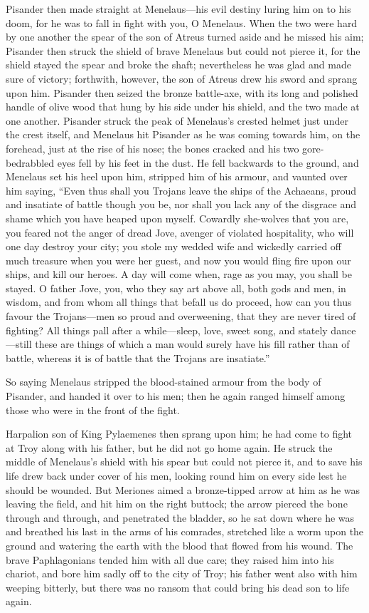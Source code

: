 Pisander then made straight at Menelaus—his evil destiny luring him
on to his doom, for he was to fall in fight with you, O Menelaus. When the
two were hard by one another the spear of the son of Atreus turned aside
and he missed his aim; Pisander then struck the shield of brave Menelaus
but could not pierce it, for the shield stayed the spear and broke the
shaft; nevertheless he was glad and made sure of victory; forthwith,
however, the son of Atreus drew his sword and sprang upon him. Pisander
then seized the bronze battle-axe, with its long and polished handle of
olive wood that hung by his side under his shield, and the two made at one
another. Pisander struck the peak of Menelaus’s crested helmet just under
the crest itself, and Menelaus hit Pisander as he was coming towards him,
on the forehead, just at the rise of his nose; the bones cracked and his
two gore-bedrabbled eyes fell by his feet in the dust. He fell backwards
to the ground, and Menelaus set his heel upon him, stripped him of his
armour, and vaunted over him saying, “Even thus shall you Trojans leave
the ships of the Achaeans, proud and insatiate of battle though you be,
nor shall you lack any of the disgrace and shame which you have heaped
upon myself. Cowardly she-wolves that you are, you feared not the anger of
dread Jove, avenger of violated hospitality, who will one day destroy your
city; you stole my wedded wife and wickedly carried off much treasure when
you were her guest, and now you would fling fire upon our ships, and kill
our heroes. A day will come when, rage as you may, you shall be stayed. O
father Jove, you, who they say art above all, both gods and men, in
wisdom, and from whom all things that befall us do proceed, how can you
thus favour the Trojans—men so proud and overweening, that they are
never tired of fighting? All things pall after a while—sleep, love,
sweet song, and stately dance—still these are things of which a man
would surely have his fill rather than of battle, whereas it is of battle
that the Trojans are insatiate.”

So saying Menelaus stripped the blood-stained armour from the body of
Pisander, and handed it over to his men; then he again ranged himself
among those who were in the front of the fight.

Harpalion son of King Pylaemenes then sprang upon him; he had come to
fight at Troy along with his father, but he did not go home again. He
struck the middle of Menelaus’s shield with his spear but could not pierce
it, and to save his life drew back under cover of his men, looking round
him on every side lest he should be wounded. But Meriones aimed a
bronze-tipped arrow at him as he was leaving the field, and hit him on the
right buttock; the arrow pierced the bone through and through, and
penetrated the bladder, so he sat down where he was and breathed his last
in the arms of his comrades, stretched like a worm upon the ground and
watering the earth with the blood that flowed from his wound. The brave
Paphlagonians tended him with all due care; they raised him into his
chariot, and bore him sadly off to the city of Troy; his father went also
with him weeping bitterly, but there was no ransom that could bring his
dead son to life again.

